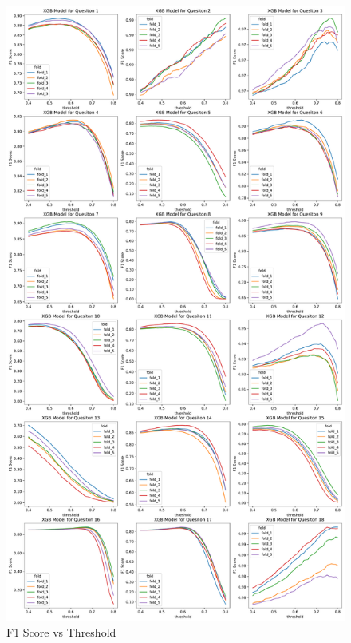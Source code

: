 \documentclass[11pt,a4paper]{article}
\begin{document}
    \begin{figure}[H]
        \centering
        \includegraphics[height = 0.95\textheight]{model_plot/f1_threshold.pdf}
        \caption{F1 Score vs Threshold}
        \label{fig:f1_score}
    \end{figure}
\end{document}
